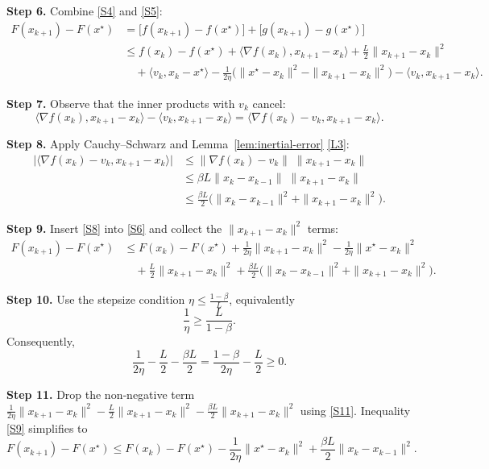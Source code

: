 \documentclass{article}
\begin{document}
\noindent\textbf{Step 6.} Combine \eqref{S4} and \eqref{S5}:
\[
\begin{aligned}
F(x_{k+1})-F(x^{\star})
&= \bigl[f(x_{k+1})-f(x^{\star})\bigr]
   +\bigl[g(x_{k+1})-g(x^{\star})\bigr] \\[0.2em]
&\le f(x_k)-f(x^{\star})
   +\langle\nabla f(x_k),x_{k+1}-x_k\rangle
   +\frac{L}{2}\|x_{k+1}-x_k\|^{2} \\[0.2em]
&\quad +\langle v_k, x_k-x^{\star}\rangle
   -\frac{1}{2\eta}\bigl(\|x^{\star}-x_k\|^{2}
   -\|x_{k+1}-x_k\|^{2}\bigr)
   -\langle v_k, x_{k+1}-x_k\rangle .
\end{aligned}
\tag{S6}
\]

\noindent\textbf{Step 7.} Observe that the inner products with $v_k$ cancel:
\[
\langle\nabla f(x_k),x_{k+1}-x_k\rangle
-\langle v_k, x_{k+1}-x_k\rangle
=\langle\nabla f(x_k)-v_k, x_{k+1}-x_k\rangle .
\tag{S7}
\]

\noindent\textbf{Step 8.} Apply Cauchy–Schwarz and Lemma~\ref{lem:inertial-error} \eqref{L3}:
\[
\begin{aligned}
\bigl|\langle\nabla f(x_k)-v_k, x_{k+1}-x_k\rangle\bigr|
&\le \|\nabla f(x_k)-v_k\|\;\|x_{k+1}-x_k\|\\
&\le \beta L\|x_k-x_{k-1}\|\;\|x_{k+1}-x_k\|\\
&\le \frac{\beta L}{2}\bigl(\|x_k-x_{k-1}\|^{2}
+\|x_{k+1}-x_k\|^{2}\bigr).
\end{aligned}
\tag{S8}
\]

\noindent\textbf{Step 9.} Insert \eqref{S8} into \eqref{S6} and collect the $\|x_{k+1}-x_k\|^{2}$ terms:
\[
\begin{aligned}
F(x_{k+1})-F(x^{\star})
&\le F(x_k)-F(x^{\star})
   +\frac{1}{2\eta}\|x_{k+1}-x_k\|^{2}
   -\frac{1}{2\eta}\|x^{\star}-x_k\|^{2} \\[0.2em]
&\quad +\frac{L}{2}\|x_{k+1}-x_k\|^{2}
   +\frac{\beta L}{2}\bigl(\|x_k-x_{k-1}\|^{2}
   +\|x_{k+1}-x_k\|^{2}\bigr).
\end{aligned}
\tag{S9}
\]

\noindent\textbf{Step 10.} Use the stepsize condition $\eta\le\frac{1-\beta}{L}$, equivalently
\[
\frac{1}{\eta}\ge\frac{L}{1-\beta}.
\tag{S10}
\]
Consequently,
\[
\frac{1}{2\eta}-\frac{L}{2}-\frac{\beta L}{2}
= \frac{1-\beta}{2\eta}-\frac{L}{2}
\ge 0.
\tag{S11}
\]

\noindent\textbf{Step 11.} Drop the non‑negative term $\frac{1}{2\eta}\|x_{k+1}-x_k\|^{2}
-\frac{L}{2}\|x_{k+1}-x_k\|^{2}
-\frac{\beta L}{2}\|x_{k+1}-x_k\|^{2}$ using \eqref{S11}. Inequality \eqref{S9} simplifies to
\[
F(x_{k+1})-F(x^{\star})
\le F(x_k)-F(x^{\star})
-\frac{1}{2\eta}\|x^{\star}-x_k\|^{2}
+\frac{\beta L}{2}\|x_k-x_{k-1}\|^{2}.
\tag{S12}
\]
\end{document}
